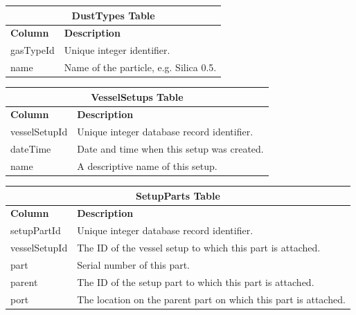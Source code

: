 \documentclass{sig-alternate}
\begin{document}
\begin{table}[h!]
\centering
\begin{tabular}{l p{6cm}}
\multicolumn{2}{c}{\bf DustTypes Table} \\ \hline
{\bf Column} & {\bf Description}\\ \hline
gasTypeId & Unique integer identifier.\\ \hline
name & Name of the particle, e.g. Silica 0.5.\\ \hline
\end{tabular}
\end{table}

\begin{table}[h!]
\centering
\begin{tabular}{l p{6cm}}
\multicolumn{2}{c}{\bf VesselSetups Table} \\ \hline
{\bf Column} & {\bf Description}\\ \hline
vesselSetupId & Unique integer database record identifier.\\ \hline
dateTime & Date and time when this setup was created.\\ \hline
name & A descriptive name of this setup.\\ \hline
\end{tabular}
\end{table}

\begin{table}[h!]
\centering
\begin{tabular}{l p{6cm}}
\multicolumn{2}{c}{\bf SetupParts Table} \\ \hline
{\bf Column} & {\bf Description}\\ \hline
setupPartId & Unique integer database record identifier.\\ \hline
vesselSetupId & The ID of the vessel setup to which this part is attached.\\ \hline
part & Serial number of this part.\\ \hline
parent & The ID of the setup part to which this part is attached.\\ \hline
port & The location on the parent part on which this part is attached.\\ \hline
\end{tabular}
\end{table}
\end{document}
